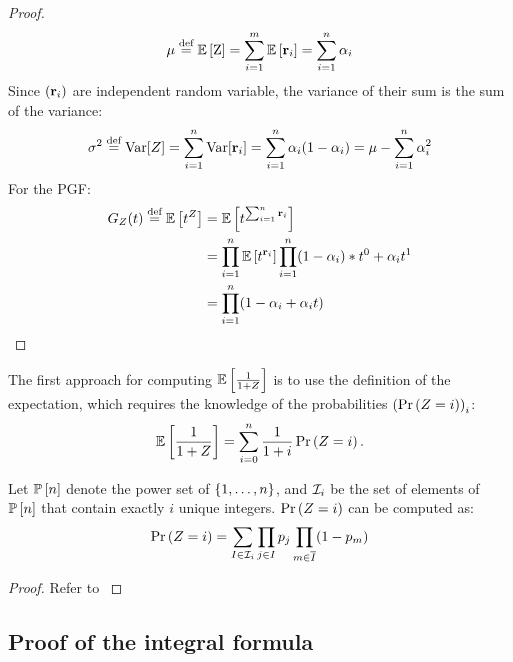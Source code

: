 \begin{proof}
	\begin{align*}
		\mu & \stackrel{\text{def}}{=} \mathbb{E}\left[{\textnormal{Z}}\right] = \sum_{i=1}^m\mathbb{E}\left[ {\mathbf{r}}_i\right] = \sum_{i=1}^n \alpha_i \\
	\end{align*}
	Since $({\mathbf{r}}_i)$ are independent random variable, the variance of their sum is the
	sum of the variance:
	\begin{align*}
		\sigma^2 & \stackrel{\text{def}}{=} \text{Var}[Z] = \sum_{i=1}^n\text{Var}[{\mathbf{r}}_i] = \sum_{i=1}^n
		\alpha_i(1-\alpha_i)=
		\mu - \sum_{i=1}^n \alpha^2_i                                                   \\
	\end{align*}
	For the PGF:
	\begin{align*}
		G_Z(t)  \stackrel{\text{def}}{=} \mathbb{E}\left[t^Z\right] & = \mathbb{E}\left[t^{\sum_{i=1}^n {\mathbf{r}}_i}\right]                                                 \\
		                        & = \prod_{i=1}^n \mathbb{E}\left[t^{{\mathbf{r}}_i}\right] \prod_{i=1}^n (1-\alpha_i) * t^0 +\alpha_i t^1 \\
		                        & = \prod_{i=1}^n (1-\alpha_i +\alpha_i t)
	\end{align*}
\end{proof}
The first approach for computing $\mathbb{E}\left[{\frac{1}{1 + Z}}\right]$ is to use the definition of the
expectation, which requires the knowledge of the probabilities $\left(\operatorname{Pr}\left(Z=i\right)\right)_i$:
\[
	\mathbb{E}\left[{\frac{1}{1 + Z}}\right] = \sum_{i=0}^n {\frac{1}{1+i}} \operatorname{Pr}\left(Z=i\right).
\]
\begin{lemma}
	\label{lemma:probas}
	Let ${\mathbb{P}}\left[n\right]$ denote the power set of $\left\lbrace1,\ldots,n\right\rbrace$, and
	${\mathcal{I}}_i$ be the set of elements of ${\mathbb{P}}\left[n\right]$ that contain exactly $i$
	unique integers. $\operatorname{Pr}\left(Z=i\right)$ can be computed as:
	\begin{align}
		\operatorname{Pr}\left(Z=i\right) = \sum_{I \in {\mathcal{I}}_i} \prod_{j\in I}p_j\prod_{m\in \overline{I}}(1-p_m)
	\end{align}
\end{lemma}
\begin{proof}
	Refer to \cite{poissonbinomial}
\end{proof}

\subsection{Proof of the integral formula}
\label{appendix:poissonexpect}

